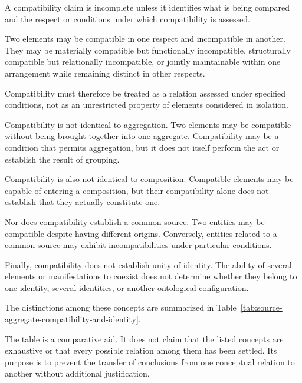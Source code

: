 A compatibility claim is incomplete unless
it identifies what is being compared and
the respect or conditions under which
compatibility is assessed.

Two elements may be compatible in one respect
and incompatible in another. They may be
materially compatible but functionally
incompatible, structurally compatible but
relationally incompatible, or jointly
maintainable within one arrangement while
remaining distinct in other respects.

Compatibility must therefore be treated
as a relation assessed under specified
conditions, not as an unrestricted property
of elements considered in isolation.

Compatibility is not identical to aggregation.
Two elements may be compatible without
being brought together into one aggregate.
Compatibility may be a condition that permits
aggregation, but it does not itself perform
the act or establish the result of grouping.

Compatibility is also not identical to
composition. Compatible elements may be
capable of entering a composition, but
their compatibility alone does not establish
that they actually constitute one.

Nor does compatibility establish a common
source. Two entities may be compatible
despite having different origins. Conversely,
entities related to a common source may
exhibit incompatibilities under particular
conditions.

Finally, compatibility does not establish
unity of identity. The ability of several
elements or manifestations to coexist
does not determine whether they belong
to one identity, several identities, or
another ontological configuration.

The distinctions among these concepts are
summarized in Table~\ref{tab:source-aggregate-compatibility-and-identity}.



The table is a comparative aid. It does not
claim that the listed concepts are exhaustive
or that every possible relation among them
has been settled. Its purpose is to prevent
the transfer of conclusions from one
conceptual relation to another without
additional justification.


